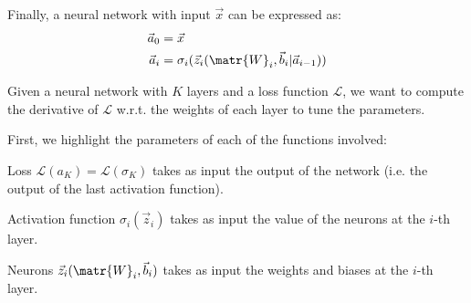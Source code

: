 \begin{description}
        Finally, a neural network with input $\vec{x}$ can be expressed as:
        \[ 
            \begin{split}
                \vec{a}_0 &= \vec{x} \\
                \vec{a}_i &= \sigma_i( \vec{z}_i(\matr{W}_i, \vec{b}_i | \vec{a}_{i-1}) )
            \end{split}
        \]

        Given a neural network with $K$ layers and a loss function $\mathcal{L}$, 
        we want to compute the derivative of $\mathcal{L}$ w.r.t. the weights of each layer to tune the parameters.

        First, we highlight the parameters of each of the functions involved:
        \begin{descriptionlist}
            \item[Loss] $\mathcal{L}(a_K) = \mathcal{L}(\sigma_K)$ takes as input the output of the network (i.e. the output of the last activation function).
            \item[Activation function] $\sigma_i(\vec{z}_i)$ takes as input the value of the neurons at the $i$-th layer.
            \item[Neurons] $\vec{z}_i(\matr{W}_i, \vec{b}_i)$ takes as input the weights and biases at the $i$-th layer.
        \end{descriptionlist}


\end{description}
